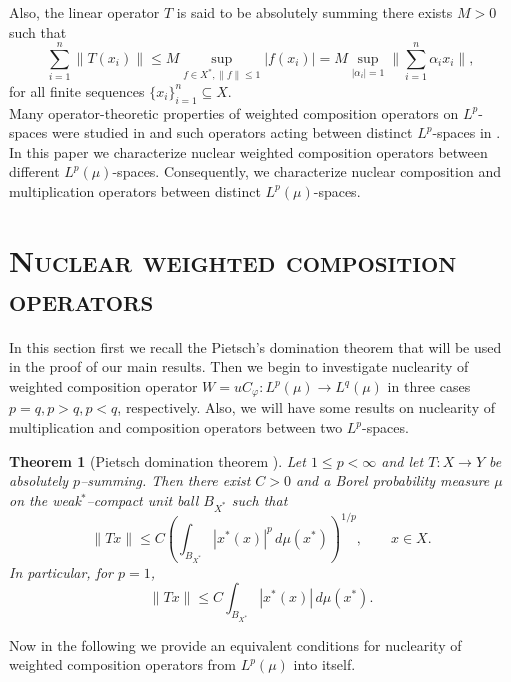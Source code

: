 \documentclass{amsart}
\newtheorem{thm}{Theorem}[section]
\theoremstyle{definition}\newtheorem{defn}[thm]{Definition}
\theoremstyle{remark}
\numberwithin{equation}{section}
\begin{document}
Also, the linear operator $T$ is said to be absolutely summing there exists $M>0$ such that
$$\sum^{n}_{i=1}\|T(x_i)\|\leq M \sup_{f\in X^*, \|f\|\leq 1}|f(x_i)|=M\sup_{|\alpha_i|=1}\|\sum^n_{i=1}\alpha_ix_i\|,$$
for all finite sequences $\{x_i\}^n_{i=1}\subseteq X$.\\

Many operator-theoretic properties of weighted composition operators on $L^p$-spaces were studied in \cite{bbl,cce,cce1,chan,ll,ll1} and such operators acting between distinct $L^p$-spaces in \cite{jab,jp,ku,tak}. 
In this paper we characterize nuclear weighted composition operators between different $L^p(\mu)$-spaces. Consequently, we characterize nuclear composition and multiplication operators between distinct $L^p(\mu)$-spaces. 

\section{\textsc{\bf Nuclear weighted composition operators}}
In this section first we recall the Pietsch's domination theorem that will be used in the proof of our main results. Then we begin to investigate nuclearity of weighted composition operator $W=uC_{\varphi}:L^p(\mu)\rightarrow L^q(\mu)$ in three cases $p=q, p>q, p<q$, respectively. Also, we will have some results on nuclearity of multiplication and composition operators between two $L^p$-spaces.

\begin{thm}[Pietsch domination theorem {\cite[Theorem~2.12]{dj}}]\label{thm:Pietsch}
Let $1\le p<\infty$ and let $T:X\to Y$ be absolutely $p$--summing.
Then there exist $C>0$ and a Borel probability measure $\mu$ on the weak$^{*}$--compact unit ball $B_{X^*}$ such that
\[
\|Tx\|
\le C\left(\int_{B_{X^*}} |x^*(x)|^p\,d\mu(x^*)\right)^{1/p},
\qquad x\in X.
\]
In particular, for $p=1$,
\[
\|Tx\|\le C\int_{B_{X^*}} |x^*(x)|\,d\mu(x^*).
\]
\end{thm}
Now in the following we provide an equivalent conditions for nuclearity of weighted composition operators from $L^p(\mu)$ into itself. 
\end{document}
